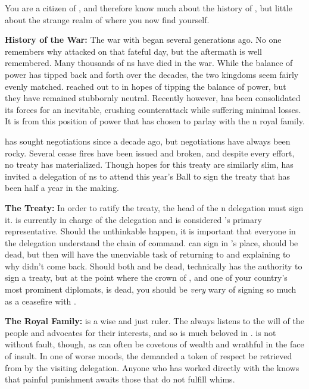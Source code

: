 \documentclass[blue]{NeptuneBall}
\begin{document}
\name{\bPacifican{}}

You are a citizen of \pPacifica{}, and therefore know much about the history of \pPacifica{}, but little about the strange realm of \pAtlantis{} where you now find yourself.

{\bf History of the War:}
The war with \pAtlantis{} began several generations ago. No one remembers why \pAtlantis{} attacked on that fateful day, but the aftermath is well remembered. Many thousands of \pPacifica{}ns have died in the war. While the balance of power has tipped back and forth over the decades, the two kingdoms seem fairly evenly matched. \pPacifica{} reached out to \pIndia{} in hopes of tipping the balance of power, but they have remained stubbornly neutral. Recently however, \pPacifica{} has been consolidated its forces for an inevitable, crushing counterattack while suffering minimal losses. It is from this position of power that \cPacificanRuler{\King} \cPacificanRuler{} has chosen to parlay with the \pAtlantis{}n royal family.

\cKing{\King} \cKing{\MYname{}} has sought negotiations since a decade ago, but negotiations have always been rocky. Several cease fires have been issued and broken, and despite every effort, no treaty has materialized. Though hopes for this treaty are similarly slim, \cKing{\King} \cKing{} has invited a delegation of \pPacifica{}ns to attend this year's \cExExKing{} Ball to sign the treaty that has been half a year in the making.

{\bf The Treaty:}
In order to ratify the treaty, the head of the \pPacifica{}n delegation must sign it. \cPrince{} is currently in charge of the delegation and is considered \pPacifica{}'s primary representative. Should the unthinkable happen, it is important that everyone in the delegation understand the chain of command. \cDiplomat{} can sign in \cPrince{}'s place, should \cPrince{} be dead, but then \cDiplomat{} will have the unenviable task of returning to \pPacifica{} and explaining to \cPacificanRuler{\King} \cPacificanRuler{} why \cPacificanRuler{\their} \cPrince{\offspring} didn't come back. Should both \cPrince{} and \cDiplomat{} be dead, technically \cSpy{} has the authority to sign a treaty, but at the point where the crown \cPrince{\prince} of \pPacifica{}, and one of your country's most prominent diplomats, is dead, you should be \emph{very} wary of signing so much as a ceasefire with \pAtlantis{}.

{\bf The Royal Family:}
\cPacificanRuler{\King} \cPacificanRuler{} is a wise and just ruler. The \cPacificanRuler{\King} always listens to the will of the people and advocates for their interests, and so is much beloved in \pPacifica{}. \cPacificanRuler{\They} is not without fault, though, as \cPacificanRuler{\they} can often be covetous of wealth and wrathful in the face of insult. In one of \cPacificanRuler{\their} worse moods, the \cPacificanRuler{\King} demanded a token of respect be retrieved from \pAtlantis{} by the visiting delegation. Anyone who has worked directly with the \cPacificanRuler{\King} knows that painful punishment awaits those that do not fulfill \cPacificanRuler{\their} whims.
\end{document}
